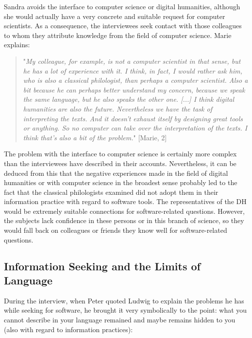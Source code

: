 \documentclass[12pt, a4paper, titlepage, oneside, abstract=true, toc=listof, toc=bibliography]{scrreprt}
\begin{document}
{Sandra avoids the interface to computer science or digital humanities, although she would actually have a very concrete and suitable request for computer scientists. As a consequence, the interviewees seek contact with those colleagues to whom they attribute knowledge from the field of computer science. Marie explains:

\begin{quotation}
"\textit{My colleague, for example, is not a computer scientist in that sense, but he has a lot of experience with it. I think, in fact, I would rather ask him, who is also a classical philologist, than perhaps a computer scientist. Also a bit because he can perhaps better understand my concern, because we speak the same language, but he also speaks the other one. [...] I think digital humanities are also the future. Nevertheless we have the task of interpreting the texts. And it doesn't exhaust itself by designing great tools or anything. So no computer can take over the interpretation of the texts. I think that's also a bit of the problem.}" [Marie, 2]
\end{quotation}

The problem with the interface to computer science is certainly more complex than the interviewees have described in their accounts. Nevertheless, it can be deduced from this that the negative experiences made in the field of digital humanities or with computer science in the broadest sense probably led to the fact that the classical philologists examined did not adopt them in their information practice with regard to software tools. The representatives of the DH would be extremely suitable connections for software-related questions. However, the subjects lack confidence in these persons or in this branch of science, so they would fall back on colleagues or friends they know well for software-related questions.

\subsection{Information Seeking and the Limits of Language}
\label{sec:seeking_language_limits}
During the interview, when Peter quoted Ludwig \citet{Wittgenstein1990} to explain the problems he has while seeking for software, he brought it very symbolically to the point: what you cannot describe in your language remained and maybe remains hidden to you (also with regard to information practices):

}
\end{document}
